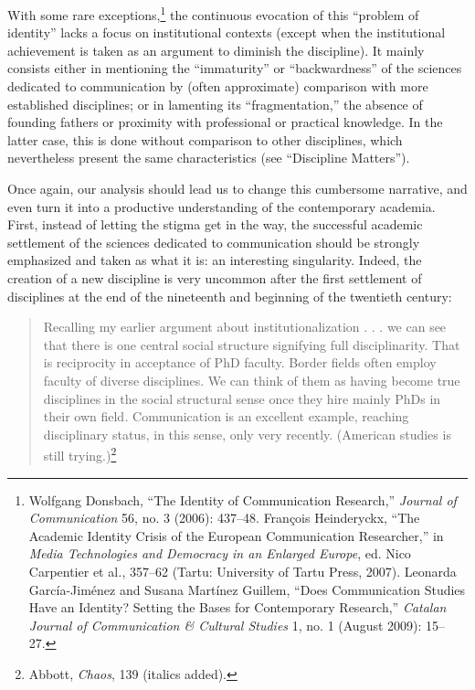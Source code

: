 \documentclass{tufte-handout}
\begin{document}
With some rare exceptions,\footnote{Wolfgang Donsbach, ``The Identity of
  Communication Research,'' \emph{Journal of Communication} 56, no. 3
  (2006): 437--48. François Heinderyckx, ``The Academic Identity Crisis
  of the European Communication Researcher,'' in \emph{Media
  Technologies and Democracy in an Enlarged Europe}, ed. Nico Carpentier
  et al\emph{.}, 357--62 (Tartu: University of Tartu Press, 2007).
  Leonarda García-Jiménez and Susana Martínez Guillem, ``Does
  Communication Studies Have an Identity? Setting the Bases for
  Contemporary Research,'' \emph{Catalan Journal of Communication \&
  Cultural Studies} 1, no. 1 (August 2009): 15--27.} the continuous
evocation of this ``problem of identity'' lacks a focus on institutional
contexts (except when the institutional achievement is taken as an
argument to diminish the discipline). It mainly consists either in
mentioning the ``immaturity'' or ``backwardness'' of the sciences
dedicated to communication by (often approximate) comparison with more
established disciplines; or in lamenting its ``fragmentation,'' the
absence of founding fathers or proximity with professional or practical
knowledge. In the latter case, this is done without comparison to other
disciplines, which nevertheless present the same characteristics (see
``Discipline Matters'').

Once again, our analysis should lead us to change this cumbersome
narrative, and even turn it into a productive understanding of the
contemporary academia. First, instead of letting the stigma get in the
way, the successful academic settlement of the sciences dedicated to
communication should be strongly emphasized and taken as what it is: an
interesting singularity. Indeed, the creation of a new discipline is
very uncommon after the first settlement of disciplines at the end of
the nineteenth and beginning of the twentieth century:

\begin{quote}
Recalling my earlier argument about institutionalization . . . we can
see that there is one central social structure signifying full
disciplinarity. That is reciprocity in acceptance of PhD faculty. Border
fields often employ faculty of diverse disciplines. We can think of them
as having become true disciplines in the social structural sense once
they hire mainly PhDs in their own field\emph{.} Communication is an
excellent example, reaching disciplinary status, in this sense, only
very recently. (American studies is still trying.)\footnote{Abbott,
  \emph{Chaos}, 139 (italics added).}
\end{quote}
\end{document}
